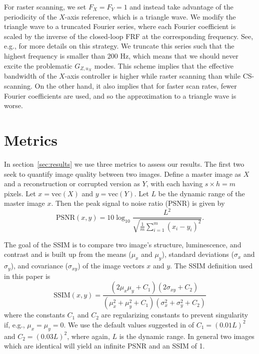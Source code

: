 \documentclass[journal]{IEEEtran}
\begin{document}
For raster scanning, we set $F_X=F_Y=1$ and instead take advantage of
the periodicity of the $X$-axis reference, which is a triangle wave.
We modify the triangle wave to a truncated Fourier series, where each
Fourier coefficient is scaled by the inverse of the closed-loop FRF at
the corresponding frequency. See, e.g., \cite{clayton_review_2009} for
more details on this strategy. We truncate this series such that the
highest frequency is smaller than 200 Hz, which means that we should
never excite the problematic $G_{Z,u_X}$ modes. This scheme implies
that the effective bandwidth of the $X$-axis controller is higher
while raster scanning than while CS-scanning. On the other hand, it
also implies that for faster scan rates, fewer Fourier
coefficients are used, and so the approximation to a triangle wave is
worse.

\section{Metrics}\label{sec:rdi}
In section~\ref{sec:results} we use three metrics to assess our
results. The first two seek to quantify image quality between two images.
Define a master image as $X$ and a reconstruction or corrupted version
as $Y$, with each having $s\times h=m$ pixels. Let $x=\textrm{vec}(X)$
and $y=\textrm{vec}(Y)$. Let $L$ be the dynamic range of the master
image $x$. Then the peak signal to noise ratio (PSNR) is given by
\begin{equation*}
  \text{PSNR}(x,y) = 10\log_{10}\frac{L^2}
  {\sqrt{\frac{1}{m} \sum_{i=1}^{m}( x_{i} - y_{i})^2 }}.
\end{equation*}

The goal of the SSIM is to compare two image's structure,
luminescence, and contrast and is built up from the means ($\mu_x$ and
$\mu_y$), standard deviations ($\sigma_x$ and $\sigma_y$), and
covariance ($\sigma_{xy}$) of the image vectors $x$ and $y$. The SSIM definition used in this paper is
\begin{equation*}
  \text{SSIM}(x,y) = \frac{(2\mu_x\mu_y + C_1)(2\sigma_{xy}+C_2)}
  {(\mu_x^2 + \mu_y^2 + C_1)(\sigma_x^2 + \sigma_y^2 + C_2)}
\end{equation*}
where the constants $C_1$ and $C_2$ are regularizing constants to
prevent singularity if, e.g., $\mu_x=\mu_y=0$. We use the default
values suggested in \cite{wang_image_2004} of $C_1=(0.01L)^2$ and
${C_2=(0.03L)^2}$, where again, $L$ is the dynamic range. In general
two images which are identical will yield an infinite PSNR and an SSIM
of 1.
\end{document}
